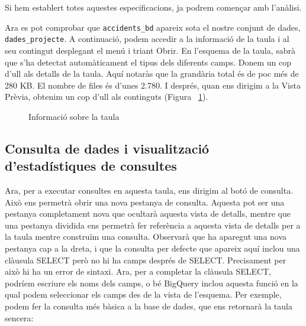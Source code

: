 \documentclass[12pt,longbibliography]{article}
\theoremstyle{definition}
\theoremstyle{remark}
\begin{document}
\vspace{2mm}

Si hem establert totes aquestes especificacions, ja podrem començar amb l’anàlisi.

\vspace{2mm}

Ara es pot comprobar que \verb|accidents_bd| apareix sota el nostre conjunt de dades, \verb|dades_projecte|. A continuació, podem accedir a la informació de la taula i al seu contingut desplegant el menú i triant Obrir. En l'esquema de la taula, sabrà que s'ha detectat automàticament el tipus dels diferents camps. Donem un cop d'ull als detalls de la taula. Aquí notaràs que la grandària total és de poc més de 280 KB. El nombre de files és d'unes 2.780. I després, quan ens dirigim a la Vista Prèvia, obtenim un cop d'ull als continguts (Figura ~\ref{fig:bq13}). 

\vspace{2mm}
\begin{figure}[h!]
\par
{}%
\hfill
{}%
\par

\caption{Informació sobre la taula}
\label{fig:bq13}
\end{figure}
\vspace{2mm}


\subsection{Consulta de dades i visualització d'estadístiques de consultes}

Ara, per a executar consultes en aquesta taula, ens dirigim al botó de consulta. Això ens permetrà obrir una nova pestanya de consulta. Aquesta pot ser una pestanya completament nova que ocultarà aquesta vista de detalls, mentre que una pestanya dividida ens permetrà fer referència a aquesta vista de detalls per a la taula mentre construïm una consulta. Observarà que ha aparegut una nova pestanya cap a la dreta, i que la consulta per defecte que apareix aquí inclou una clàusula SELECT però no hi ha camps després de SELECT. Precisament per això hi ha un error de sintaxi. Ara, per a completar la clàusula SELECT, podríem escriure els noms dels camps, o bé BigQuery inclou aquesta funció en la qual podem seleccionar els camps des de la vista de l'esquema. Per exemple, podem fer la consulta més bàsica a la base de dades, que ens retornarà la taula sencera:
\end{document}

